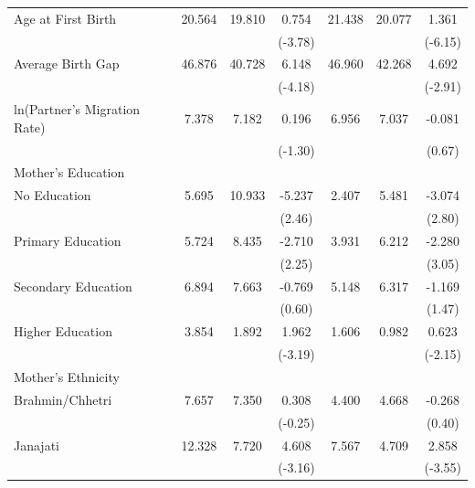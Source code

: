 \begin{longtable}{@{}l*{6}{c}@{}}
Age at First Birth & 20.564 & 19.810 & 0.754\sym{***} & 21.438 & 20.077 & 1.361\sym{***} \\
                    &         &         & (-3.78) &         &         & (-6.15) \\
Average Birth Gap & 46.876 & 40.728 & 6.148\sym{***} & 46.960 & 42.268 & 4.692\sym{***} \\
                    &         &         & (-4.18) &         &         & (-2.91) \\
ln(Partner's Migration Rate) & 7.378 & 7.182 & 0.196 & 6.956 & 7.037 & -0.081 \\
                    &         &         & (-1.30) &         &         & (0.67) \\
\multicolumn{7}{l}{Mother's Education} \\
\hspace{1em}No Education & 5.695 & 10.933 & -5.237\sym{**} & 2.407 & 5.481 & -3.074\sym{***} \\
                    &         &         & (2.46) &         &         & (2.80) \\
\hspace{1em}Primary Education & 5.724 & 8.435 & -2.710\sym{**} & 3.931 & 6.212 & -2.280\sym{***} \\
                    &         &         & (2.25) &         &         & (3.05) \\
\hspace{1em}Secondary Education & 6.894 & 7.663 & -0.769 & 5.148 & 6.317 & -1.169 \\
                    &         &         & (0.60) &         &         & (1.47) \\
\hspace{1em}Higher Education & 3.854 & 1.892 & 1.962\sym{***} & 1.606 & 0.982 & 0.623\sym{**} \\
                    &         &         & (-3.19) &         &         & (-2.15) \\
\multicolumn{7}{l}{Mother's Ethnicity} \\
\hspace{1em}Brahmin/Chhetri & 7.657 & 7.350 & 0.308 & 4.400 & 4.668 & -0.268 \\
                    &         &         & (-0.25) &         &         & (0.40) \\
\hspace{1em}Janajati & 12.328 & 7.720 & 4.608\sym{***} & 7.567 & 4.709 & 2.858\sym{***} \\
                    &         &         & (-3.16) &         &         & (-3.55) \\

\end{longtable}
